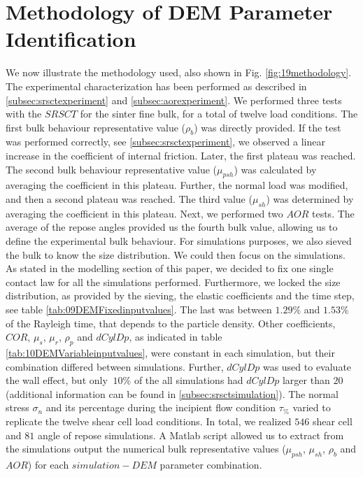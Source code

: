 \section{Methodology of DEM Parameter Identification}
\label{sec:methodology}

We now illustrate the methodology used, also shown in Fig.
\ref{fig:19methodology}.
The experimental characterization has been performed as described in
\ref{subsec:srsctexperiment} and \ref{subsec:aorexperiment}. We performed
three tests with the $SRSCT$ for the sinter fine bulk, for a total of twelve
load conditions. 
The first bulk behaviour representative value ($\rho_b$) was directly provided. 
If the test was performed correctly, see \ref{subsec:srsctexperiment}, we
observed a linear increase in the coefficient of internal friction.
Later, the first plateau was reached. 
The second bulk behaviour representative value ($\mu_{psh}$) was calculated by averaging the coefficient in this plateau. 
Further, the normal load was modified, and then a second plateau was reached. The third value ($\mu_{sh}$) was 
determined by averaging the coefficient in this plateau. 
Next, we performed two $AOR$ tests. 
The average of the repose angles provided us the fourth bulk value, allowing us
to define the experimental bulk behaviour.
For simulations purposes, we also sieved the bulk to know the size distribution.
We could then focus on the simulations. 
As stated in the modelling section of this paper, we decided to fix one single
contact law for all the simulations performed.
Furthermore, we locked the size distribution, as provided by the sieving, the
elastic coefficients and the time step, see table
\ref{tab:09DEMFixedinputvalues}.
The last was between $1.29 \%$ and $1.53 \%$ of the Rayleigh time, that depends
to the particle density.
Other coefficients, $COR$, $\mu_s$, $\mu_r$,
$\rho_p$ and $dCylDp$, as indicated in table \ref{tab:10DEMVariableinputvalues},
were constant in each simulation, but their combination differed between
simulations.
Further, $dCylDp$ was used to evaluate the wall effect, but only $~10\%$ of the
all simulations had $dCylDp$ larger than $20$ (additional information can be found in \ref{subsec:srsctsimulation}). 
The normal stress $\sigma_n$ and its
percentage during the incipient flow condition $\tau_{\%}$
varied to replicate the twelve shear cell load conditions. 
In total, we realized $546$ shear cell and $81$ angle of repose simulations.
A Matlab script allowed us to extract from the simulations output the numerical
bulk representative values ($\mu_{psh}$, $\mu_{sh}$, $\rho_b$ and $AOR$) for each $simulation-DEM$ parameter combination. 
